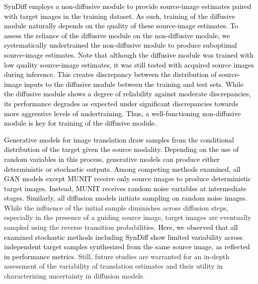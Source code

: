 \documentclass[journal,twoside,web]{ieeecolor}
\newcommand*{\revhl}{\textcolor{black}}
\begin{document}
\revhl{SynDiff employs a non-diffusive module to provide source-image estimates paired with target images in the training dataset. As such, training of the diffusive module naturally depends on the quality of these source-image estimates. To assess the reliance of the diffusive module on the non-diffusive module, we systematically undertrained the non-diffusive module to produce suboptimal source-image estimates. Note that although the diffusive module was trained with low quality source-image estimates, it was still tested with acquired source images during inference. This creates discrepancy between the distribution of source-image inputs to the diffusive module between the training and test sets. While the diffusive module shows a degree of reliability against moderate discrepancies, its performance degrades as expected under significant discrepancies towards more aggressive levels of undertraining. Thus, a well-functioning non-diffusive module is key for training of the diffusive module.}


\revhl{Generative models for image translation draw samples from the conditional distribution of the target given the source modality. Depending on the use of random variables in this process, generative models can produce either deterministic or stochastic outputs. Among competing methods examined, all GAN models except MUNIT receive only source images to produce deterministic target images. Instead, MUNIT receives random noise variables at intermediate stages. Similarly, all diffusion models initiate sampling on random noise images.} While the influence of the initial sample diminishes across diffusion steps, especially in the presence of a guiding source image, target images are eventually sampled using the reverse transition probabilities. \revhl{Here, we observed that all examined stochastic methods including SynDiff show limited variability across independent target samples synthesized from the same source image, as reflected in performance metrics}. Still, future studies are warranted for an in-depth assessment of the variability of translation estimates and their utility in characterizing uncertainty in diffusion models. 
\end{document}
